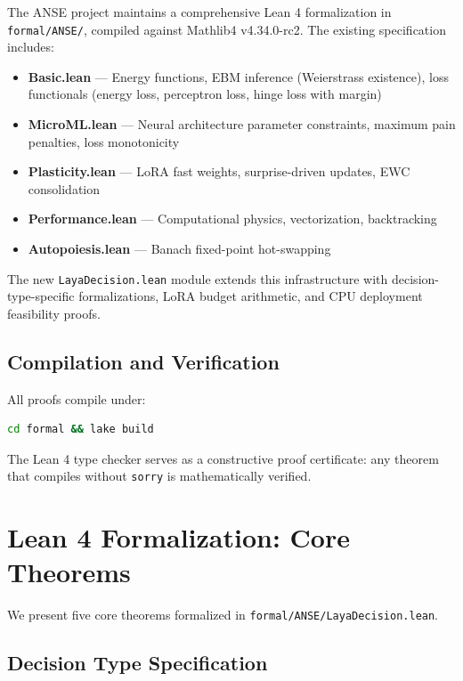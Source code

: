 \documentclass[10pt,journal,compsoc]{IEEEtran}
\theoremstyle{remark}
\begin{document}
The ANSE project maintains a comprehensive Lean 4 formalization in \texttt{formal/ANSE/}, compiled against Mathlib4 v4.34.0-rc2. The existing specification includes:

\begin{itemize}
    \item \textbf{Basic.lean} --- Energy functions, EBM inference (Weierstrass existence), loss functionals (energy loss, perceptron loss, hinge loss with margin)
    \item \textbf{MicroML.lean} --- Neural architecture parameter constraints, maximum pain penalties, loss monotonicity
    \item \textbf{Plasticity.lean} --- LoRA fast weights, surprise-driven updates, EWC consolidation
    \item \textbf{Performance.lean} --- Computational physics, vectorization, backtracking
    \item \textbf{Autopoiesis.lean} --- Banach fixed-point hot-swapping
\end{itemize}

The new \texttt{LayaDecision.lean} module extends this infrastructure with decision-type-specific formalizations, LoRA budget arithmetic, and CPU deployment feasibility proofs.

\subsection{Compilation and Verification}
All proofs compile under:
\begin{lstlisting}[language=bash,numbers=none,frame=none,backgroundcolor=\color{white}]
cd formal && lake build
\end{lstlisting}
The Lean 4 type checker serves as a constructive proof certificate: any theorem that compiles without \texttt{sorry} is mathematically verified.

\section{Lean 4 Formalization: Core Theorems}

We present five core theorems formalized in \texttt{formal/ANSE/LayaDecision.lean}.

\subsection{Decision Type Specification}
\end{document}
